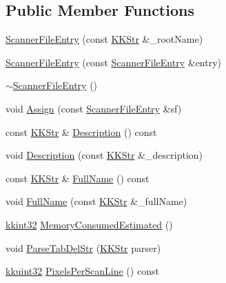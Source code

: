 \subsection*{Public Member Functions}
\begin{DoxyCompactItemize}
\item 
\hyperlink{class_k_k_l_s_c_1_1_scanner_file_entry_ae5a17e4b65dcce8e9b689f711aa19daf}{Scanner\+File\+Entry} (const \hyperlink{class_k_k_b_1_1_k_k_str}{K\+K\+Str} \&\+\_\+root\+Name)
\item 
\hyperlink{class_k_k_l_s_c_1_1_scanner_file_entry_a3b7b1e3a714ded9e72565797e93c2810}{Scanner\+File\+Entry} (const \hyperlink{class_k_k_l_s_c_1_1_scanner_file_entry}{Scanner\+File\+Entry} \&entry)
\item 
\hyperlink{class_k_k_l_s_c_1_1_scanner_file_entry_a6843ac30a2217a356960dd31c79985c6}{$\sim$\+Scanner\+File\+Entry} ()
\item 
void \hyperlink{class_k_k_l_s_c_1_1_scanner_file_entry_acc0d3ec4712c565dcbe82dec0c6244df}{Assign} (const \hyperlink{class_k_k_l_s_c_1_1_scanner_file_entry}{Scanner\+File\+Entry} \&sf)
\item 
const \hyperlink{class_k_k_b_1_1_k_k_str}{K\+K\+Str} \& \hyperlink{class_k_k_l_s_c_1_1_scanner_file_entry_a8203567f8775502d1472b0f071f1e04a}{Description} () const 
\item 
void \hyperlink{class_k_k_l_s_c_1_1_scanner_file_entry_a95bcd689a44ae1bde1e064731b1c101d}{Description} (const \hyperlink{class_k_k_b_1_1_k_k_str}{K\+K\+Str} \&\+\_\+description)
\item 
const \hyperlink{class_k_k_b_1_1_k_k_str}{K\+K\+Str} \& \hyperlink{class_k_k_l_s_c_1_1_scanner_file_entry_acd117c729f945b454006036d842a823b}{Full\+Name} () const 
\item 
void \hyperlink{class_k_k_l_s_c_1_1_scanner_file_entry_a3451db8f6215cef6e590e5d65ab09e45}{Full\+Name} (const \hyperlink{class_k_k_b_1_1_k_k_str}{K\+K\+Str} \&\+\_\+full\+Name)
\item 
\hyperlink{namespace_k_k_b_a8fa4952cc84fda1de4bec1fbdd8d5b1b}{kkint32} \hyperlink{class_k_k_l_s_c_1_1_scanner_file_entry_a557c98997e4f989661fa7c2a74107b1c}{Memory\+Consumed\+Estimated} ()
\item 
void \hyperlink{class_k_k_l_s_c_1_1_scanner_file_entry_a038647bc99be3a022541da2ed12e539f}{Parse\+Tab\+Del\+Str} (\hyperlink{class_k_k_b_1_1_k_k_str}{K\+K\+Str} parser)
\item 
\hyperlink{namespace_k_k_b_af8d832f05c54994a1cce25bd5743e19a}{kkuint32} \hyperlink{class_k_k_l_s_c_1_1_scanner_file_entry_a5974173d9da712f8a62820e2a46d170b}{Pixels\+Per\+Scan\+Line} () const 

\end{DoxyCompactItemize}

